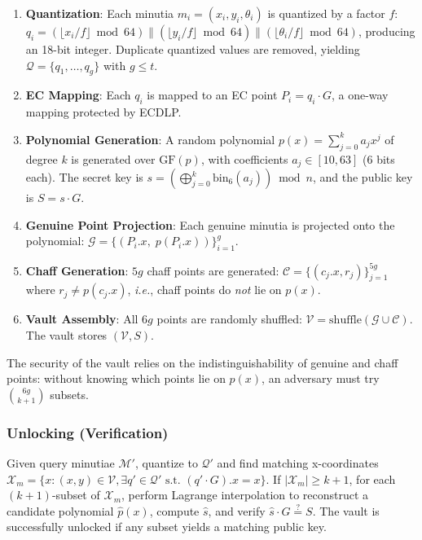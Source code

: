 \documentclass[3p,twocolumn]{elsarticle}
\newcommand{\GFp}{\mathrm{GF}(p)}
\newcommand{\ie}{\textit{i.e.}}
\begin{document}
\begin{enumerate}
    \item \textbf{Quantization}: Each minutia $m_i = (x_i, y_i, \theta_i)$ is quantized by a factor $f$: $q_i = (\lfloor x_i/f \rfloor \bmod 64) \| (\lfloor y_i/f \rfloor \bmod 64) \| (\lfloor \theta_i/f \rfloor \bmod 64)$, producing an 18-bit integer. Duplicate quantized values are removed, yielding $\mathcal{Q} = \{q_1, \ldots, q_g\}$ with $g \leq t$.
    \item \textbf{EC Mapping}: Each $q_i$ is mapped to an EC point $P_i = q_i \cdot G$, a one-way mapping protected by ECDLP.
    \item \textbf{Polynomial Generation}: A random polynomial $p(x) = \sum_{j=0}^{k} a_j x^j$ of degree $k$ is generated over $\GFp{}$, with coefficients $a_j \in [10, 63]$ (6 bits each). The secret key is $s = \left(\bigoplus_{j=0}^{k} \text{bin}_6(a_j)\right) \bmod n$, and the public key is $S = s \cdot G$.
    \item \textbf{Genuine Point Projection}: Each genuine minutia is projected onto the polynomial: $\mathcal{G} = \{(P_i.x, \; p(P_i.x))\}_{i=1}^{g}$.
    \item \textbf{Chaff Generation}: $5g$ chaff points are generated: $\mathcal{C} = \{(c_j.x, r_j)\}_{j=1}^{5g}$ where $r_j \neq p(c_j.x)$, \ie{}, chaff points do \emph{not} lie on $p(x)$.
    \item \textbf{Vault Assembly}: All $6g$ points are randomly shuffled: $\mathcal{V} = \text{shuffle}(\mathcal{G} \cup \mathcal{C})$. The vault stores $(\mathcal{V}, S)$.
\end{enumerate}

The security of the vault relies on the indistinguishability of genuine and chaff points: without knowing which points lie on $p(x)$, an adversary must try $\binom{6g}{k+1}$ subsets.

\subsubsection{Unlocking (Verification)}
Given query minutiae $\mathcal{M}'$, quantize to $\mathcal{Q}'$ and find matching x-coordinates $\mathcal{X}_m = \{x : (x,y) \in \mathcal{V}, \exists q' \in \mathcal{Q}' \text{ s.t. } (q' \cdot G).x = x\}$. If $|\mathcal{X}_m| \geq k+1$, for each $(k{+}1)$-subset of $\mathcal{X}_m$, perform Lagrange interpolation to reconstruct a candidate polynomial $\hat{p}(x)$, compute $\hat{s}$, and verify $\hat{s} \cdot G \stackrel{?}{=} S$. The vault is successfully unlocked if any subset yields a matching public key.
\end{document}
